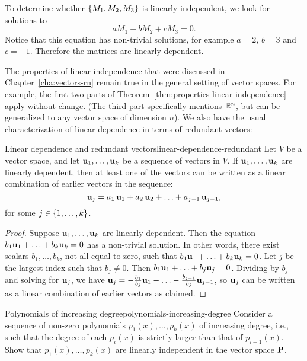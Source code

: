 \begin{solution}
  To determine whether $\left\{M_1,M_2,M_3\right\}$ is linearly independent, we
  look for solutions to
  \begin{equation*}
    aM_1 + bM_2 + cM_3 = 0.
  \end{equation*}
  Notice that this equation has non-trivial solutions, for example
  $a=2$, $b=3$ and $c=-1$. Therefore the matrices are linearly
  dependent.
\end{solution}

The properties of linear independence that were discussed in
Chapter~\ref{cha:vectors-rn} remain true in the general setting of
vector spaces. For example, the first two parts of
Theorem~\ref{thm:properties-linear-independence} apply without change.
(The third part specifically mentions $\mathbb{R}^n$, but can be generalized
to any vector space of dimension $n$). We also have the usual
characterization of linear dependence in terms of redundant vectors:

\begin{proposition}{Linear dependence and redundant vectors}{linear-dependence-redundant}
  Let $V$ be a vector space, and let $\mbox{\bf u}_1,\ldots,\mbox{\bf u}_k$ be
  a sequence of vectors in $V$. If $\mbox{\bf u}_1,\ldots,\mbox{\bf u}_k$ are
  linearly dependent, then at least one of the vectors can be written
  as a linear combination of earlier vectors in the sequence:
  \begin{equation*}
    \mbox{\bf u}_j = a_1\,\mbox{\bf u}_1 + a_2\,\mbox{\bf u}_2 + \ldots + a_{j-1}\,\mbox{\bf u}_{j-1},
  \end{equation*}
  for some $j\in\left\{1,\ldots,k\right\}$.
\end{proposition}

\begin{proof}
  Suppose $\mbox{\bf u}_1,\ldots,\mbox{\bf u}_k$ are linearly dependent. Then
  the equation $b_1\mbox{\bf u}_1+\ldots+b_k\mbox{\bf u}_k=0$ has a
  non-trivial solution. In other words, there exist scalars
  $b_1,\ldots,b_k$, not all equal to zero, such that
  $b_1\mbox{\bf u}_1+\ldots+b_k\mbox{\bf u}_k=0$. Let $j$ be the largest index
  such that $b_j\neq 0$. Then
  $b_1\mbox{\bf u}_1+\ldots+b_j\mbox{\bf u}_j=0$. Dividing by $b_j$ and
  solving for $\mbox{\bf u}_j$, we have
  $\mbox{\bf u}_j = -\frac{b_1}{b_j}\mbox{\bf u}_1 - \ldots -
  \frac{b_{j-1}}{b_j}\mbox{\bf u}_{j-1}$, so $\mbox{\bf u}_j$ can be written
  as a linear combination of earlier vectors as claimed.
\end{proof}

\begin{example}{Polynomials of increasing degree}{polynomials-increasing-degree}
  Consider a sequence of non-zero polynomials $p_1(x), \ldots, p_k(x)$
  of increasing degree, i.e., such that the degree of each $p_i(x)$ is
  strictly larger than that of $p_{i-1}(x)$. Show that
  $p_1(x),\ldots,p_k(x)$ are linearly independent in the vector space
  $\mathbf{P}$.
\end{example}

